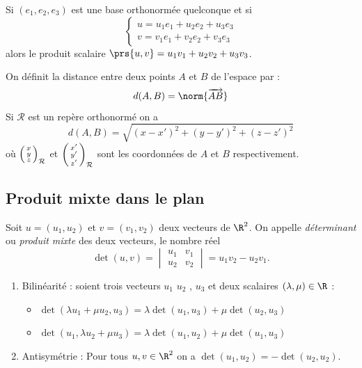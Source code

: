 \begin{proposition}
Si $(e_1,e_2,e_3)$ est une base orthonormée quelconque et si 
\[
	\begin{cases}
		u = u_1 e_1 + u_2 e_2 + u_3 e_3 \\
		v = v_1 e_1 + v_2 e_2 + v_3 e_3
	\end{cases}
\]
alors le produit scalaire $\prs{u,v} = u_1 v_1 + u_2v_2 + u_3v_3$.
\end{proposition}


\begin{definition}
	On définit la distance entre deux points $A$ et $B$ de l'espace par :
	\[
		d(A,B) = \norm{\overrightarrow{AB}}
	\]
	Si $\mathcal R$ est un repère orthonormé on a 
	\[
		d(A,B) = \sqrt{(x-x')^2+ (y-y')^2 + (z-z')^2 }
	\]
	où $\begin{psmallmatrix}
		x\\y\\z
	\end{psmallmatrix}_{\mathcal R}$ et $\begin{psmallmatrix}
		x'\\y'\\z'
	\end{psmallmatrix}_{\mathcal R}$ sont les coordonnées de $A$ et $B$ respectivement.
\end{definition}


\subsection{Produit mixte dans le plan}

\begin{definition}
Soit $u = (u_1,u_2)$  et $v = (v_1,v_2) $  deux vecteurs de $\R^2$. %
On appelle \emph{déterminant} ou \emph{produit mixte} des deux vecteurs, le nombre réel
\[
	\det(u,v) =\begin{vmatrix}
			u_1 & v_1 \\
			u_2 & v_2
		\end{vmatrix} = u_1v_2 - u_2v_1. %
\]
\end{definition}

\begin{proposition}
	\begin{enumerate}
		\item Bilinéarité : soient trois vecteurs $u_1$ $u_2$ , $u_3$ et deux scalaires $(\lambda,\mu)\in \R$ :
			\begin{itemize}
				\item  $\det(\lambda u_1 + \mu u_2, u_3) = \lambda \det(u_1,u_3) + \mu \det(u_2,u_3) $
				\item $\det(u_1,\lambda u_2 + \mu u_3) = \lambda \det(u_1,u_2) + \mu \det(u_1,u_3)$ 
			\end{itemize}
		\item Antisymétrie : Pour tous $u,v\in\R^2$ on a $\det(u_1,u_2) = -\det(u_2,u_2)$.
	\end{enumerate}
\end{proposition}

